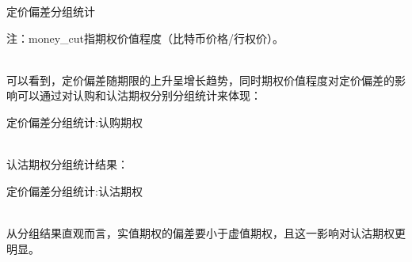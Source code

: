 \begin{center}
    \begin{threeparttable}[H]
        \centering
        \begin{small}
            \caption{定价偏差分组统计}
            \label{tab:option_bias_group}
                
                \begin{tablenotes}
                    \footnotesize
                    \item 注：money\_cut指期权价值程度（比特币价格/行权价）。
                \end{tablenotes}
        \end{small}
    \end{threeparttable}
        
\end{center}
~\\
可以看到，定价偏差随期限的上升呈增长趋势，同时期权价值程度对定价偏差的影响可以通过对认购和认沽期权分别分组统计来体现：
~\\
\begin{center}
    \begin{threeparttable}[H]
        \begin{small}
            \caption{定价偏差分组统计:认购期权}
            \label{tab:call_option_bias_group}
                
        \end{small}
    \end{threeparttable}
        
\end{center}
~\\
认沽期权分组统计结果：
~\\
\begin{center}
    \begin{threeparttable}[H]
        \begin{small}
            \caption{定价偏差分组统计:认沽期权}
            \label{tab:put_option_bias_group}
                
    
        \end{small}
    \end{threeparttable}
        
\end{center}
~\\
从分组结果直观而言，实值期权的偏差要小于虚值期权，且这一影响对认沽期权更明显。

